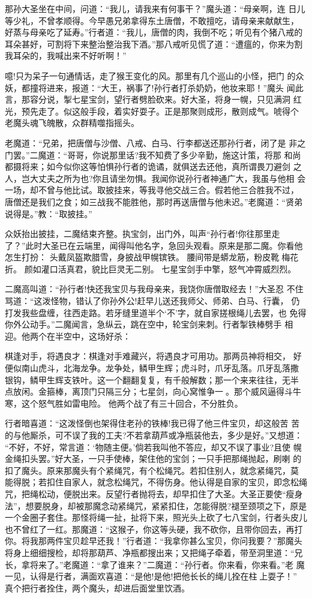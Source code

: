 那孙大圣坐在中间，问道：“我儿，请我来有何事干？”魔头道：“母亲啊，连
日儿等少礼，不曾孝顺得。今早愚兄弟拿得东土唐僧，不敢擅吃，请母亲来献献生，
好蒸与母亲吃了延寿。”行者道：“我儿，唐僧的肉，我倒不吃；听见有个猪八戒的
耳朵甚好，可割将下来整治整治我下酒。”那八戒听见慌了道：“遭瘟的，你来为割
我耳朵的，我喊出来不好听啊！”

噫!只为呆子一句通情话，走了猴王变化的风。那里有几个巡山的小怪，把门
的众妖，都撞将进来，报道：“大王，祸事了!孙行者打杀奶奶，他妆来耶！”魔头
闻此言，那容分说，掣七星宝剑，望行者劈脸砍来。好大圣，将身一幌，只见满洞
红光，预先走了。似这般手段，着实好耍子。正是那聚则成形，散则成气。唬得个
老魔头魂飞魄散，众群精噬指摇头。

老魔道：“兄弟，把唐僧与沙僧、八戒、白马、行李都送还那孙行者，闭了是
非之门罢。”二魔道：“哥哥，你说那里话?我不知费了多少辛勤，施这计策，将那
和尚都摄将来；如今似你这等怕惧孙行者的诡谲，就俱送去还他，真所谓畏刀避剑
之人，岂大丈夫之所为也?你且请坐勿惧。我闻你说孙行者神通广大，我虽与他相
会一场，却不曾与他比试。取披挂来，等我寻他交战三合。假若他三合胜我不过，
唐僧还是我们之食；如三战我不能胜他，那时再送唐僧与他未迟。”老魔道：“贤弟
说得是。”教：“取披挂。”

众妖抬出披挂，二魔结束齐整。执宝剑，出门外，叫声“孙行者!你往那里走
了？”此时大圣已在云端里，闻得叫他名字，急回头观看。原来是那二魔。你看他
怎生打扮：
头戴凤盔欺腊雪，身披战甲幌镔铁。
腰间带是蟒龙筋，粉皮靴梅花折。
颜如灌口活真君，貌比巨灵无二别。
七星宝剑手中擎，怒气冲霄威烈烈。

二魔高叫道：“孙行者!快还我宝贝与我母亲来，我饶你唐僧取经去！”大圣忍
不住骂道：“这泼怪物，错认了你孙外公!赶早儿送还我师父、师弟、白马、行囊，
仍打发我些盘缠，往西走路。若牙缝里道半个‘不’字，就自家搓根绳儿去罢，也
免得你外公动手。”二魔闻言，急纵云，跳在空中，轮宝剑来刺。行者掣铁棒劈手
相迎。他两个在半空中，这场好杀：

棋逢对手，将遇良才：棋逢对手难藏兴，将遇良才可用功。那两员神将相交，
好便似南山虎斗，北海龙争。龙争处，鳞甲生辉；虎斗时，爪牙乱落。爪牙乱落撒
银钩，鳞甲生辉支铁叶。这一个翻翻复复，有千般解数；那一个来来往往，无半
点放闲。金箍棒，离顶门只隔三分；七星剑，向心窝惟争一。那个威风逼得斗牛
寒，这个怒气胜如雷电险。
他两个战了有三十回合，不分胜负。

行者暗喜道：“这泼怪倒也架得住老孙的铁棒!我已得了他三件宝贝，却这般苦
苦的与他厮杀，可不误了我的工夫?不若拿葫芦或净瓶装他去，多少是好。”又想道：
“不好，不好，常言道：‘物随主便。’倘若我叫他不答应，却又不误了事业?且使
幌金绳扣头罢。”好大圣，一只手使棒，架住他的宝剑；一只手把那绳抛起，刷喇
的扣了魔头。原来那魔头有个紧绳咒，有个松绳咒。若扣住别人，就念紧绳咒，莫
能得脱；若扣住自家人，就念松绳咒，不得伤身。他认得是自家的宝贝，即念松绳
咒，把绳松动，便脱出来。反望行者抛将去，却早扣住了大圣。大圣正要使“瘦身
法”，想要脱身，却被那魔念动紧绳咒，紧紧扣住，怎能得脱?褪至颈项之下，原是
一个金圈子套住。那怪将绳一扯，扯将下来，照光头上砍了七八宝剑，行者头皮儿
也不曾红了一红。那魔道：“这猴子，你这等头硬，我不砍你，且带你回去，再打
你。将我那两件宝贝趁早还我！”行者道：“我拿你甚么宝贝，你问我要？”那魔头
将身上细细搜检，却将那葫芦、净瓶都搜出来；又把绳子牵着，带至洞里道：“兄
长，拿将来了。”老魔道：“拿了谁来？”二魔道：“孙行者。你来看，你来看。”老
魔一见，认得是行者，满面欢喜道：“是他!是他!把他长长的绳儿拴在柱上耍子！”
真个把行者拴住，两个魔头，却进后面堂里饮酒。

